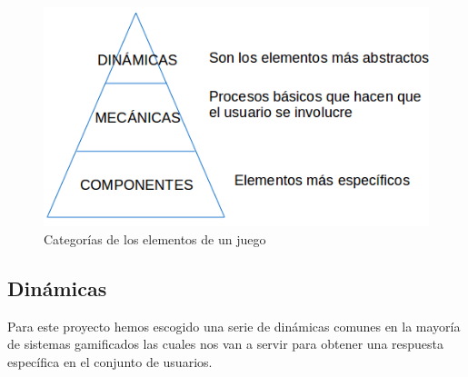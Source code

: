 \begin{figure}[ht]
	\includegraphics[width=1\textwidth]{imagenes/secciones/introduccion/dinamicas_mecanicas_componentes.png}
	\caption{Categorías de los elementos de un juego}
	\label{introduccion1}
\end{figure}

\subsection{Dinámicas}

Para este proyecto hemos escogido una serie de dinámicas comunes en la mayoría de sistemas gamificados las cuales nos van a servir para obtener una respuesta específica en el conjunto de usuarios.


